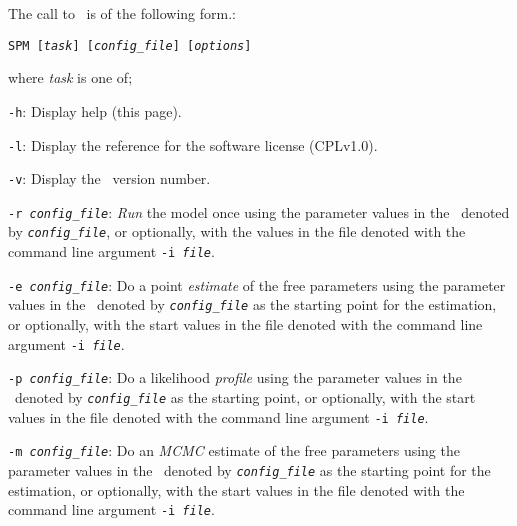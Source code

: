 The call to \SPM\ is of the following form.: 

\texttt{SPM [\emph{task}] [\emph{config\_file}] [\emph{options}]}

where \emph{task} is one of;
\begin{description}
\item \texttt{-h}:{\hspace{0.5cm}  Display help (this page).}

\item \texttt{-l}:{\hspace{0.5cm} Display the reference for the software license (CPLv1.0).}

\item \texttt{-v}:{\hspace{0.5cm} Display the \SPM\ version number.}

\item \texttt{-r \emph{config\_file}}:{\hspace{0.5cm} \emph{Run} the model once using the parameter values in the \config\ denoted by \emph{\texttt{config\_file}}, or optionally, with the values in the file denoted with the command line argument \texttt{-i \emph{file}}.}

\item \texttt{-e \emph{config\_file}}:{\hspace{0.5cm} Do a point \emph{estimate} of the free parameters using the parameter values in the \config\ denoted by \emph{\texttt{config\_file}} as the starting point for the estimation, or optionally, with the start values in the file denoted with the command line argument \texttt{-i \emph{file}}.}

\item \texttt{-p \emph{config\_file}}:{\hspace{0.5cm} Do a likelihood \emph{profile} using the parameter values in the \config\ denoted by \emph{\texttt{config\_file}} as the starting point, or optionally, with the start values in the file denoted with the command line argument \texttt{-i \emph{file}}.}

\item \texttt{-m \emph{config\_file}}:{\hspace{0.5cm} Do an \emph{MCMC} estimate of the free parameters using the parameter values in the \config\ denoted by \emph{\texttt{config\_file}} as the starting point for the estimation, or optionally, with the start values in the file denoted with the command line argument \texttt{-i \emph{file}}.}


\end{description}
